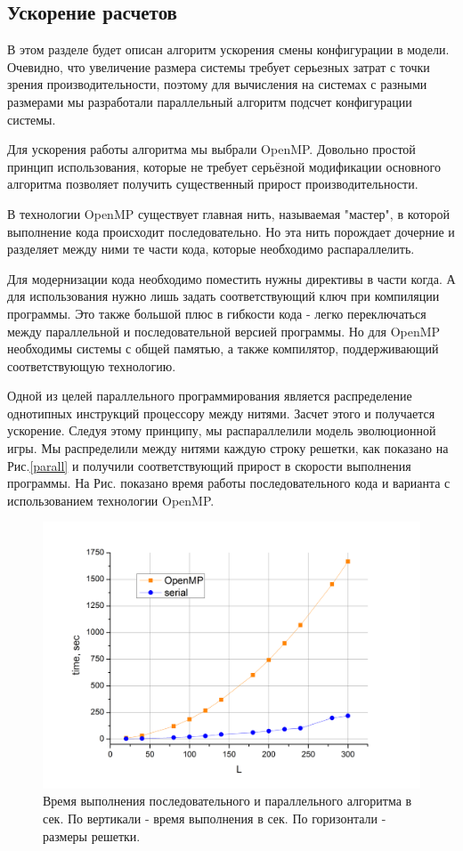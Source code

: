 \documentclass[12pt,a4paper]{article}
\begin{document}
	\subsection{Ускорение расчетов}
	
	\par В этом разделе будет описан алгоритм ускорения смены конфигурации в модели. Очевидно, что увеличение размера системы требует серьезных затрат с точки зрения производительности, поэтому для вычисления на системах с разными размерами мы разработали параллельный алгоритм подсчет конфигурации системы.
	
	\par Для ускорения работы алгоритма мы выбрали OpenMP. Довольно простой принцип использования, которые не требует серьёзной модификации основного алгоритма позволяет получить существенный прирост производительности.
	
	\par В технологии OpenMP существует главная нить, называемая "мастер", в которой выполнение кода происходит последовательно. Но эта нить порождает дочерние и разделяет между ними те части кода, которые необходимо распараллелить. 
	
	\par Для модернизации кода необходимо поместить нужны директивы в части когда. А для использования нужно лишь задать соответствующий ключ при компиляции программы. Это также большой плюс в гибкости кода - легко переключаться между параллельной и последовательной версией программы. Но для OpenMP необходимы системы с общей памятью, а также компилятор, поддерживающий соответствующую технологию.
	
	\par Одной из целей параллельного программирования является распределение однотипных инструкций процессору между нитями. Засчет этого и получается ускорение. Следуя этому принципу, мы распараллелили модель эволюционной игры. Мы распределили между нитями каждую строку решетки, как показано на Рис.\ref{parall} и получили соответствующий прирост в скорости выполнения программы. На Рис. показано время работы последовательного кода и варианта с использованием технологии OpenMP.
	
	\begin{figure}
		\label{time}
		\centering
		\includegraphics[width=0.7\linewidth]{time.png}
		\caption{Время выполнения последовательного и параллельного алгоритма в сек. По вертикали - время выполнения в сек. По горизонтали - размеры решетки.}
	\end{figure}
	
\end{document}

